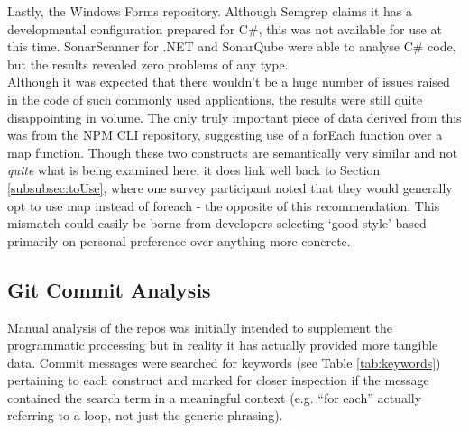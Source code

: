 \documentclass{article}
\begin{document}
            Lastly, the Windows Forms repository. Although Semgrep claims it has a developmental configuration prepared for C\#, this was not available for use at this time. SonarScanner for .NET and SonarQube were able to analyse C\# code, but the results revealed zero problems of any type.
            \\
            Although it was expected that there wouldn't be a huge number of issues raised in the code of such commonly used applications, the results were still quite disappointing in volume. The only truly important piece of data derived from this was from the NPM CLI repository, suggesting use of a forEach function over a map function. Though these two constructs are semantically very similar and not \emph{quite} what is being examined here, it does link well back to Section \ref{subsubsec:toUse}, where one survey participant noted that they would generally opt to use map instead of foreach - the opposite of this recommendation. This mismatch could easily be borne from developers selecting `good style' based primarily on personal preference over anything more concrete.

    \subsection{Git Commit Analysis}
    \label{subsec:commitAnalysis}
        Manual analysis of the repos was initially intended to supplement the programmatic processing but in reality it has actually provided more tangible data. Commit messages were searched for keywords (see Table \ref{tab:keywords}) pertaining to each construct and marked for closer inspection if the message contained the search term in a meaningful context (e.g. ``for each'' actually referring to a loop, not just the generic phrasing).
        
\end{document}
